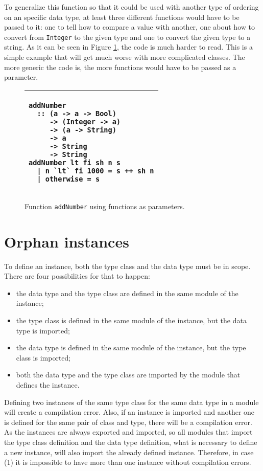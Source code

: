 \documentclass[msc]{ppgccufmg}
\begin{document}
To generalize this function so that it could be used with another type of ordering on an specific data type, at least three different functions would have to be passed to it: one to tell how to compare a value with another, one about how to convert from \texttt{Integer} to the given type and one to convert the given type to a string.
As it can be seen in Figure \ref{byExample}, the code is much harder to read.
This is a simple example that will get much worse with more complicated classes.
The more generic the code is, the more functions would have to be passed as a parameter.

\begin{figure}
\caption{Function \texttt{addNumber} using functions as parameters.\label{byExample}}
\begin{tabular}{|p{\textwidth}|}
\hline
\begin{verbatim}
addNumber
  :: (a -> a -> Bool)
     -> (Integer -> a)
     -> (a -> String)
     -> a
     -> String
     -> String
addNumber lt fi sh n s
  | n `lt` fi 1000 = s ++ sh n
  | otherwise = s
\end{verbatim}
\\
\hline
\end{tabular}
\end{figure}

\section{Orphan instances}
\label{Orphan-instances}

To define an instance, both the type class and the data type must be in scope.  There are four possibilities for that to happen:
\begin{itemize}
\item the data type and the type class are defined in the same module of the instance;
\item the type class is defined in the same module of the instance, but the data type is imported;
\item the data type is defined in the same module of the instance, but the type class is imported;
\item both the data type and the type class are imported by the module that defines the instance.
\end{itemize}
Defining two instances of the same type class for the same data type in a module will create a compilation error.
Also, if an instance is imported and another one is defined for the same pair of class and type, there will be a compilation error.
As the instances are always exported and imported, so all modules that import the type class definition and the data type definition, what is necessary to define a new instance, will also import the already defined instance.
Therefore, in case (1) it is impossible to have more than one instance without compilation errors.
\end{document}
